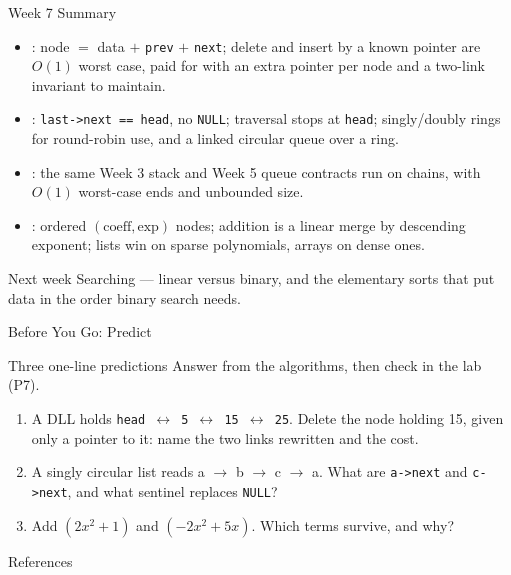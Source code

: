 \documentclass[aspectratio=169]{beamer}
\begin{document}
\begin{frame}{Week 7 Summary}
  \begin{itemize}
    \item {}: node $=$ data $+$ \texttt{prev} $+$
      \texttt{next}; delete and insert by a known pointer are $O(1)$ worst
      case, paid for with an extra pointer per node and a two-link invariant
      to maintain.
    \item {}: \texttt{last->next == head}, no \texttt{NULL};
      traversal stops at \texttt{head}; singly/doubly rings for round-robin
      use, and a linked circular queue over a ring.
    \item {}: the same Week 3 stack and Week 5 queue contracts
      run on chains, with $O(1)$ worst-case ends and unbounded size.
    \item {}: ordered $(\text{coeff}, \text{exp})$ nodes;
      addition is a linear merge by descending exponent; lists win on sparse
      polynomials, arrays on dense ones.
  \end{itemize}
  \begin{exampleblock}{Next week}
    Searching --- linear versus binary, and the elementary sorts that put data
    in the order binary search needs.
  \end{exampleblock}
\end{frame}

\begin{frame}{Before You Go: Predict}
  \begin{block}{Three one-line predictions}
    Answer from the algorithms, then check in the lab (P7).
  \end{block}
  \begin{enumerate}
    \item A DLL holds \texttt{head $\leftrightarrow$ 5 $\leftrightarrow$ 15
      $\leftrightarrow$ 25}. Delete the node holding 15, given only a pointer
      to it: name the two links rewritten and the cost.
    \item A singly circular list reads a $\to$ b $\to$ c $\to$ a. What are
      \texttt{a->next} and \texttt{c->next}, and what sentinel replaces
      \texttt{NULL}?
    \item Add $(2x^{2} + 1)$ and $(-2x^{2} + 5x)$. Which terms survive, and
      why?
  \end{enumerate}
\end{frame}

\begin{frame}[allowframebreaks]{References}
  \scriptsize
  
  
\end{frame}
\end{document}
